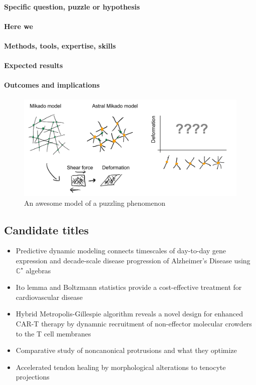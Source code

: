 \documentclass[onecolumn,11pt]{article}
\begin{document}
\paragraph{Specific question, puzzle or hypothesis}\lipsum[2]
\paragraph{Here we}\lipsum[2]
\paragraph{Methods, tools, expertise, skills}\lipsum[2]
\paragraph{Expected results}\lipsum[2]
\paragraph{Outcomes and implications}\lipsum[2]


\begin{figure}[h!]
\centering
\includegraphics[width=4.5in]{figures/figJeanJacket.pdf}
\caption{\label{fig:JeanJacketSchematic}An awesome model of a puzzling phenomenon}
\end{figure}

\subsection{Candidate titles}
 
\begin{itemize}
\item Predictive dynamic modeling connects timescales of day-to-day gene expression and decade-scale disease progression of Alzheimer's Disease using $\mathbb{C}^\star$ algebras
\item Ito lemma and Boltzmann statistics provide a cost-effective treatment for cardiovascular disease
\item Hybrid Metropolis-Gillespie algorithm reveals a novel design for enhanced CAR-T therapy by dynamnic recruitment of non-effector molecular crowders to the T cell membranes
\item Comparative study of noncanonical protrusions and what they optimize
\item Accelerated tendon healing by morphological alterations to tenocyte projections
\end{itemize}
\end{document}
